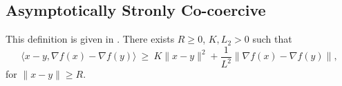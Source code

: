 \documentclass{article}
\begin{document}
\subsection{Asymptotically Stronly Co-coercive}
This definition is given in \cite{bourabee2023}. There exists $R\geq0$, $K,L_2>0$ such that
\begin{equation}
    \langle x - y, \nabla f(x) - \nabla f(y)\rangle\ \geq\ K\|x-y\|^2 + \frac{1}{L^2}\|\nabla f(x) - \nabla f(y)\|,
\end{equation}
for $\|x-y\|\geq R$.

\newpage


\end{document}

